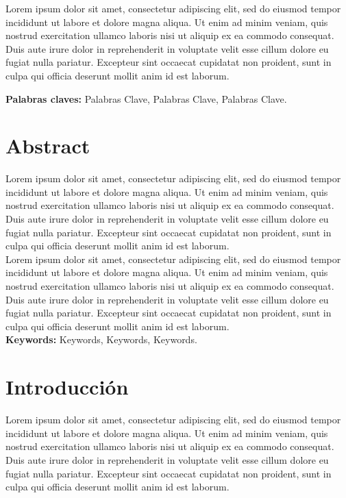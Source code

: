 \documentclass[11pt]{report} %
\begin{document}
Lorem ipsum dolor sit amet, consectetur adipiscing elit, sed do eiusmod tempor incididunt ut labore et dolore magna aliqua. Ut enim ad minim veniam, quis nostrud exercitation ullamco laboris nisi ut aliquip ex ea commodo consequat. Duis aute irure dolor in reprehenderit in voluptate velit esse cillum dolore eu fugiat nulla pariatur. Excepteur sint occaecat cupidatat non proident, sunt in culpa qui officia deserunt mollit anim id est laborum.

\textbf{Palabras claves:} Palabras Clave, Palabras Clave, Palabras Clave.

\chapter*{Abstract}

Lorem ipsum dolor sit amet, consectetur adipiscing elit, sed do eiusmod tempor incididunt ut labore et dolore magna aliqua. Ut enim ad minim veniam, quis nostrud exercitation ullamco laboris nisi ut aliquip ex ea commodo consequat. Duis aute irure dolor in reprehenderit in voluptate velit esse cillum dolore eu fugiat nulla pariatur. Excepteur sint occaecat cupidatat non proident, sunt in culpa qui officia deserunt mollit anim id est laborum.\\

Lorem ipsum dolor sit amet, consectetur adipiscing elit, sed do eiusmod tempor incididunt ut labore et dolore magna aliqua. Ut enim ad minim veniam, quis nostrud exercitation ullamco laboris nisi ut aliquip ex ea commodo consequat. Duis aute irure dolor in reprehenderit in voluptate velit esse cillum dolore eu fugiat nulla pariatur. Excepteur sint occaecat cupidatat non proident, sunt in culpa qui officia deserunt mollit anim id est laborum.\\

\textbf{Keywords:} Keywords, Keywords, Keywords.

\chapter*{Introducción}

Lorem ipsum dolor sit amet, consectetur adipiscing elit, sed do eiusmod tempor incididunt ut labore et dolore magna aliqua. Ut enim ad minim veniam, quis nostrud exercitation ullamco laboris nisi ut aliquip ex ea commodo consequat. Duis aute irure dolor in reprehenderit in voluptate velit esse cillum dolore eu fugiat nulla pariatur. Excepteur sint occaecat cupidatat non proident, sunt in culpa qui officia deserunt mollit anim id est laborum.\\
\end{document}
